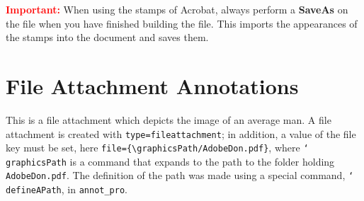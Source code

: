 \documentclass{article}
\newcommand{\cs}[1]{\texttt{\char`\\#1}}
\begin{document}
\textbf{\textcolor{red}{Important:}} When using the stamps of
Acrobat, always perform a \textbf{SaveAs} on the file when you have finished
building the file. This imports the appearances of the stamps into
the document and saves them.


\section{File Attachment Annotations}

This is a file attachment 
which depicts the image of an average man. A file attachment is created with \texttt{type=fileattachment}; in addition,
a value of the file key must be set, here \verb!file={\graphicsPath/AdobeDon.pdf}!, where \cs{graphicsPath} is a command
that expands to the path to the folder holding \texttt{AdobeDon.pdf}. The definition of the path was made using
a special command, \cs{defineAPath}, in \texttt{annot\_pro}.
\end{document}
